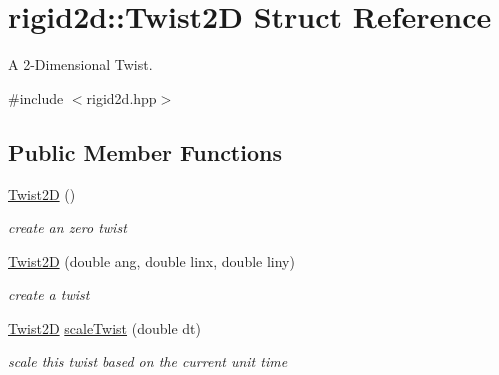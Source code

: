\hypertarget{structrigid2d_1_1Twist2D}{}\section{rigid2d\+:\+:Twist2D Struct Reference}
\label{structrigid2d_1_1Twist2D}


A 2-\/\+Dimensional Twist.  




{\ttfamily \#include $<$rigid2d.\+hpp$>$}

\subsection*{Public Member Functions}
\begin{DoxyCompactItemize}
\item 
\mbox{\label{structrigid2d_1_1Twist2D_a8a317315c9dc111b01e0f3c53af072b4}} 
\hyperlink{structrigid2d_1_1Twist2D_a8a317315c9dc111b01e0f3c53af072b4}{Twist2D} ()
\begin{DoxyCompactList}\small\item\em create an zero twist \end{DoxyCompactList}\item 
\hyperlink{structrigid2d_1_1Twist2D_a957e7c727d48e4d2b3f6c2390533e1bb}{Twist2D} (double ang, double linx, double liny)
\begin{DoxyCompactList}\small\item\em create a twist \end{DoxyCompactList}\item 
\hyperlink{structrigid2d_1_1Twist2D}{Twist2D} \hyperlink{structrigid2d_1_1Twist2D_ad5fb3449c63fceb7519c89ac84d3546e}{scale\+Twist} (double dt)
\begin{DoxyCompactList}\small\item\em scale this twist based on the current unit time \end{DoxyCompactList}\end{DoxyCompactItemize}
